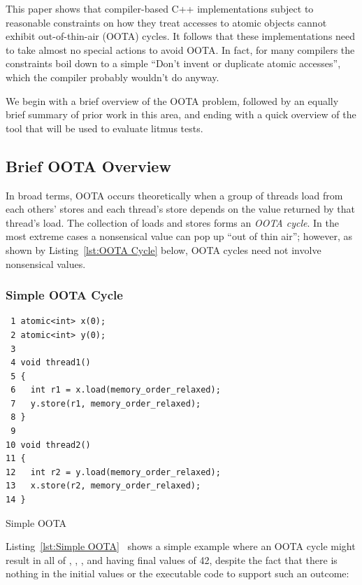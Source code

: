 \documentclass[10]{article}
\begin{document}
This paper shows that compiler-based C++ implementations subject to
reasonable constraints on how they treat accesses to atomic objects
cannot exhibit out-of-thin-air (OOTA) cycles.
It follows that these implementations need to take almost no special
actions to avoid OOTA.
In fact, for many compilers the constraints boil down to a simple
``Don't invent or duplicate atomic accesses'', which the compiler
probably wouldn't do anyway.

We begin with a brief overview of the OOTA problem, followed
by an equally brief summary of prior work in this area, and ending
with a quick overview of the  tool that will be used to
evaluate litmus tests.

\subsection{Brief OOTA Overview}
\label{sec:Brief OOTA Overview}

In broad terms,
OOTA occurs theoretically when a group of threads load from each others' stores
and each thread's store depends on the value returned by that thread's load.
The collection of loads and stores forms an \emph{OOTA cycle}.
In the most extreme cases a nonsensical value can pop up ``out of thin air'';
however, as shown by
Listing~\ref{lst:OOTA Cycle} below,
OOTA cycles need not involve nonsensical values.

\subsubsection{Simple OOTA Cycle}
\label{sec:Simple OOTA Cycle}

\begin{listing}[tbp]
\begin{verbatim}
 1 atomic<int> x(0);
 2 atomic<int> y(0);
 3
 4 void thread1()
 5 {
 6   int r1 = x.load(memory_order_relaxed);
 7   y.store(r1, memory_order_relaxed);
 8 }
 9
10 void thread2()
11 {
12   int r2 = y.load(memory_order_relaxed);
13   x.store(r2, memory_order_relaxed);
14 }
\end{verbatim}
\caption{Simple OOTA}
\label{lst:Simple OOTA}
\end{listing}

Listing~\ref{lst:Simple OOTA}~\cite{PaulEMcKenney2020RelaxedGuideRelaxed}
shows a simple example where an OOTA cycle might result in all of ,
, , and  having final values of 42, despite the fact
that there is nothing in the initial values or the executable code to
support such an outcome:
\end{document}
